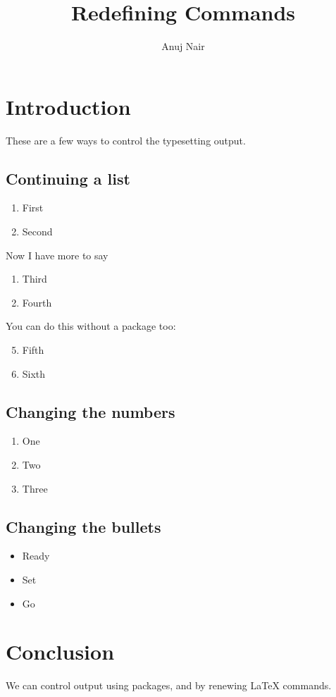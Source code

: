 \documentclass{article}
\title{Redefining Commands}
\author{Anuj Nair}
\date{}
\begin{document}
\maketitle

\section{Introduction}
   These are a few ways to control the typesetting output.

				\subsection{Continuing a list}

  \begin{enumerate}
		\item First
		\item Second
	\end{enumerate}

  Now I have more to say
	\begin{enumerate}[resume]
		\item Third
		\item Fourth
	\end{enumerate}

  You can do this without a package too:
	\begin{enumerate}
		\setcounter{enumi}{4}
		\item Fifth
		\item Sixth
	\end{enumerate}
				
				
				\subsection{Changing the numbers}
				
				\renewcommand{\theenumi}{\Alph{enumi}}
				\begin{enumerate}
					\item One
					\item Two
					\item Three
				\end{enumerate}
				
				\subsection{Changing the bullets}

				\renewcommand{\labelitemi}{$\rightarrow$}
  			\begin{itemize}
					\item Ready
					\item Set 
					\item Go
				\end{itemize}

     

\section{Conclusion}

 We can control output using packages, and by renewing {\LaTeX} commands.
\end{document}
